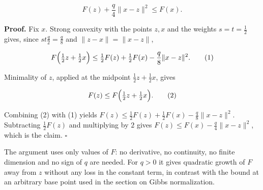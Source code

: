 \documentclass[11pt,a4paper]{article}
\begin{document}
\[F(z)+\frac q4\|x-z\|^2\le F(x).\]


\textbf{Proof.} Fix \(x\). Strong convexity with the points \(z,x\) and the weights \(s=t=\frac12\) gives, since \(st\frac q2=\frac q8\) and \(\|z-x\|=\|x-z\|\),


\[F\Bigl(\tfrac12z+\tfrac12x\Bigr)\le\tfrac12F(z)+\tfrac12F(x)-\frac q8\|x-z\|^2.\qquad(1)\]


Minimality of \(z\), applied at the midpoint \(\frac12z+\frac12x\), gives


\[F(z)\le F\Bigl(\tfrac12z+\tfrac12x\Bigr).\qquad(2)\]


Combining (2) with (1) yields \(F(z)\le\frac12F(z)+\frac12F(x)-\frac q8\|x-z\|^2\). Subtracting \(\frac12F(z)\) and multiplying by \(2\) gives \(F(z)\le F(x)-\frac q4\|x-z\|^2\), which is the claim. \(\square\)




The argument uses only values of \(F\): no derivative, no continuity, no finite dimension and no sign of \(q\) are needed. For \(q>0\) it gives quadratic growth of \(F\) away from \(z\) without any loss in the constant term, in contrast with the bound at an arbitrary base point used in the section on Gibbs normalization.
\end{document}
